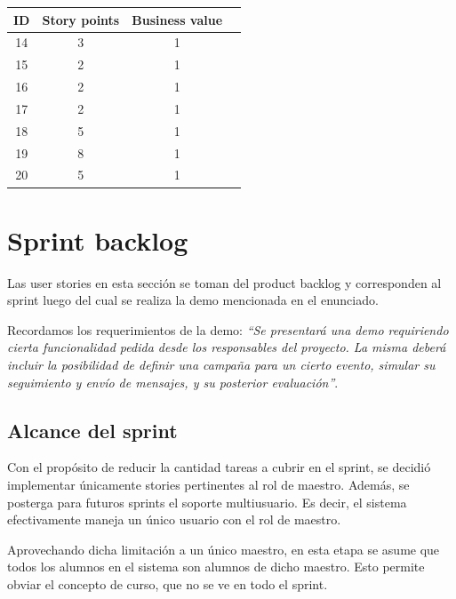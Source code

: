\documentclass[a4paper, 10pt, twoside]{article}
\begin{document}
\begin{center}
\begin{tabular}{|c|c|c|c|}
\hline
ID & Story points & Business value\\
\hline
14 & 3 & 1\\
15 & 2 & 1\\
16 & 2 & 1\\
17 & 2 & 1\\
18 & 5 & 1\\
19 & 8 & 1\\
20 & 5 & 1\\
\hline
\end{tabular}
\end{center}




\newpage
\section{Sprint backlog}

Las user stories en esta sección se toman del product backlog y corresponden al sprint luego del cual se realiza la demo mencionada en el enunciado.

Recordamos los requerimientos de la demo: \emph{``Se presentará una demo requiriendo cierta funcionalidad pedida desde los responsables del proyecto. La misma deberá incluir la posibilidad de definir una campaña para un cierto evento, simular su seguimiento y envío de mensajes, y su posterior evaluación''}.


\subsection{Alcance del sprint}

Con el propósito de reducir la cantidad tareas a cubrir en el sprint, se decidió implementar únicamente stories pertinentes al rol de maestro. Además, se posterga para futuros sprints el soporte multiusuario. Es decir, el sistema efectivamente maneja un único usuario con el rol de maestro.

Aprovechando dicha limitación a un único maestro, en esta etapa se asume que todos los alumnos en el sistema son alumnos de dicho maestro. Esto permite obviar el concepto de curso, que no se ve en todo el sprint.
\end{document}
